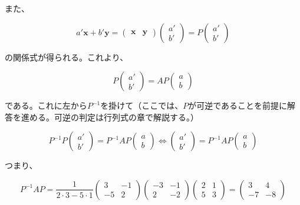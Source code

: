 \documentclass[dvipdfmx,autodetect-engine]{jsarticle}
\theoremstyle{definition}
\begin{document}
また、

$$
a'\bm{x} + b'\bm{y} = 
\begin{pmatrix}
\bm{x} & \bm{y}
\end{pmatrix}
\begin{pmatrix}
a' \\
b'
\end{pmatrix} =
P\begin{pmatrix}
a' \\
b'
\end{pmatrix}
$$

の関係式が得られる。これより、

$$
P\begin{pmatrix}
a' \\
b'
\end{pmatrix} = 
AP\begin{pmatrix}
a \\
b
\end{pmatrix}
$$

である。これに左から$P^{-1}$を掛けて（ここでは、$P$が可逆であることを前提に解答を進める。可逆の判定は行列式の章で解説する。）

$$
P^{-1}P\begin{pmatrix}
a' \\
b'
\end{pmatrix} =
P^{-1}AP\begin{pmatrix}
a \\
b
\end{pmatrix}
\Longleftrightarrow
\begin{pmatrix}
a' \\
b'
\end{pmatrix} =
P^{-1}AP\begin{pmatrix}
a \\
b
\end{pmatrix}
$$

つまり、

$$
P^{-1}AP = 
\frac{1}{2 \cdot 3 -5 \cdot 1}\begin{pmatrix}
3 & -1 \\
-5 & 2
\end{pmatrix}
\begin{pmatrix}
-3 & -1 \\
2 & -2
\end{pmatrix}
\begin{pmatrix}
2 & 1 \\
5 & 3
\end{pmatrix} = 
\begin{pmatrix}
3 & 4 \\
-7 & -8
\end{pmatrix}
$$
\end{document}
